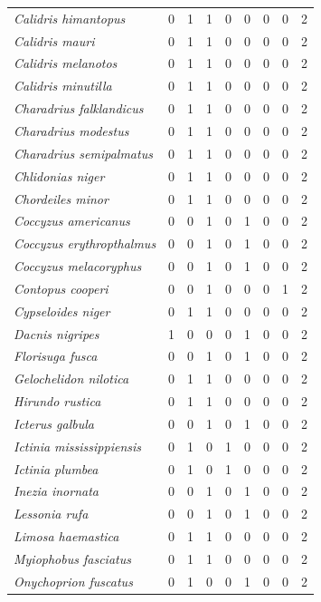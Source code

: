 \documentclass[
  oneside]{scrbook}
\begin{document}
\begin{longtable}[t]{>{}lrrrrrlrl}
\em{Calidris himantopus} & 0 & 1 & 1 & 0 & 0 & 0 & 0 & 2\\
\em{Calidris mauri} & 0 & 1 & 1 & 0 & 0 & 0 & 0 & 2\\
\em{Calidris melanotos} & 0 & 1 & 1 & 0 & 0 & 0 & 0 & 2\\
\em{Calidris minutilla} & 0 & 1 & 1 & 0 & 0 & 0 & 0 & 2\\
\addlinespace
\em{Charadrius falklandicus} & 0 & 1 & 1 & 0 & 0 & 0 & 0 & 2\\
\em{Charadrius modestus} & 0 & 1 & 1 & 0 & 0 & 0 & 0 & 2\\
\em{Charadrius semipalmatus} & 0 & 1 & 1 & 0 & 0 & 0 & 0 & 2\\
\em{Chlidonias niger} & 0 & 1 & 1 & 0 & 0 & 0 & 0 & 2\\
\em{Chordeiles minor} & 0 & 1 & 1 & 0 & 0 & 0 & 0 & 2\\
\addlinespace
\em{Coccyzus americanus} & 0 & 0 & 1 & 0 & 1 & 0 & 0 & 2\\
\em{Coccyzus erythropthalmus} & 0 & 0 & 1 & 0 & 1 & 0 & 0 & 2\\
\em{Coccyzus melacoryphus} & 0 & 0 & 1 & 0 & 1 & 0 & 0 & 2\\
\em{Contopus cooperi} & 0 & 0 & 1 & 0 & 0 & 0 & 1 & 2\\
\em{Cypseloides niger} & 0 & 1 & 1 & 0 & 0 & 0 & 0 & 2\\
\addlinespace
\em{Dacnis nigripes} & 1 & 0 & 0 & 0 & 1 & 0 & 0 & 2\\
\em{Florisuga fusca} & 0 & 0 & 1 & 0 & 1 & 0 & 0 & 2\\
\em{Gelochelidon nilotica} & 0 & 1 & 1 & 0 & 0 & 0 & 0 & 2\\
\em{Hirundo rustica} & 0 & 1 & 1 & 0 & 0 & 0 & 0 & 2\\
\em{Icterus galbula} & 0 & 0 & 1 & 0 & 1 & 0 & 0 & 2\\
\addlinespace
\em{Ictinia mississippiensis} & 0 & 1 & 0 & 1 & 0 & 0 & 0 & 2\\
\em{Ictinia plumbea} & 0 & 1 & 0 & 1 & 0 & 0 & 0 & 2\\
\em{Inezia inornata} & 0 & 0 & 1 & 0 & 1 & 0 & 0 & 2\\
\em{Lessonia rufa} & 0 & 0 & 1 & 0 & 1 & 0 & 0 & 2\\
\em{Limosa haemastica} & 0 & 1 & 1 & 0 & 0 & 0 & 0 & 2\\
\addlinespace
\em{Myiophobus fasciatus} & 0 & 1 & 1 & 0 & 0 & 0 & 0 & 2\\
\em{Onychoprion fuscatus} & 0 & 1 & 0 & 0 & 1 & 0 & 0 & 2\\

\end{longtable}
\end{document}
